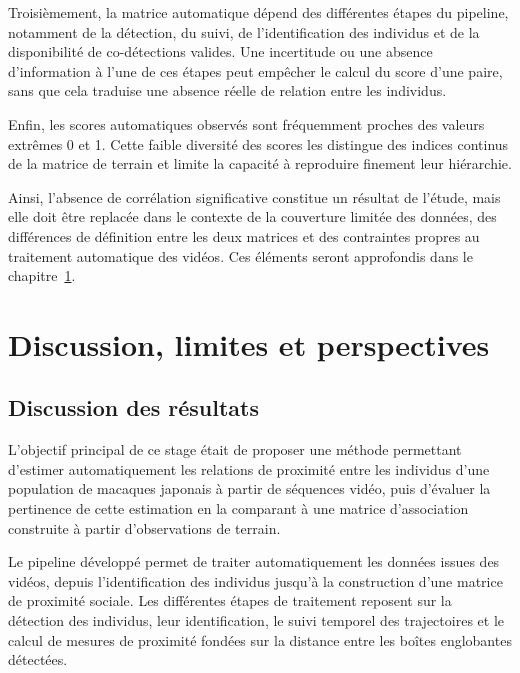 \documentclass[11pt,a4paper]{report}
\begin{document}
Troisièmement, la matrice automatique dépend des différentes étapes du
pipeline, notamment de la détection, du suivi, de l'identification des
individus et de la disponibilité de co-détections valides. Une
incertitude ou une absence d'information à l'une de ces étapes peut
empêcher le calcul du score d'une paire, sans que cela traduise une
absence réelle de relation entre les individus.

Enfin, les scores automatiques observés sont fréquemment proches des
valeurs extrêmes 0 et 1. Cette faible diversité des scores les distingue
des indices continus de la matrice de terrain et limite la capacité à
reproduire finement leur hiérarchie.

Ainsi, l'absence de corrélation significative constitue un résultat de
l'étude, mais elle doit être replacée dans le contexte de la couverture
limitée des données, des différences de définition entre les deux
matrices et des contraintes propres au traitement automatique des
vidéos. Ces éléments seront approfondis dans le
chapitre~\ref{chap:discussion}.


\chapter{Discussion, limites et perspectives}
\label{chap:discussion}

\section{Discussion des résultats}

L'objectif principal de ce stage était de proposer une méthode permettant
d'estimer automatiquement les relations de proximité entre les individus
d'une population de macaques japonais à partir de séquences vidéo, puis
d'évaluer la pertinence de cette estimation en la comparant à une matrice
d'association construite à partir d'observations de terrain.

Le pipeline développé permet de traiter automatiquement les données
issues des vidéos, depuis l'identification des individus jusqu'à la
construction d'une matrice de proximité sociale. Les différentes étapes
de traitement reposent sur la détection des individus, leur
identification, le suivi temporel des trajectoires et le calcul de
mesures de proximité fondées sur la distance entre les boîtes
englobantes détectées.
\end{document}
